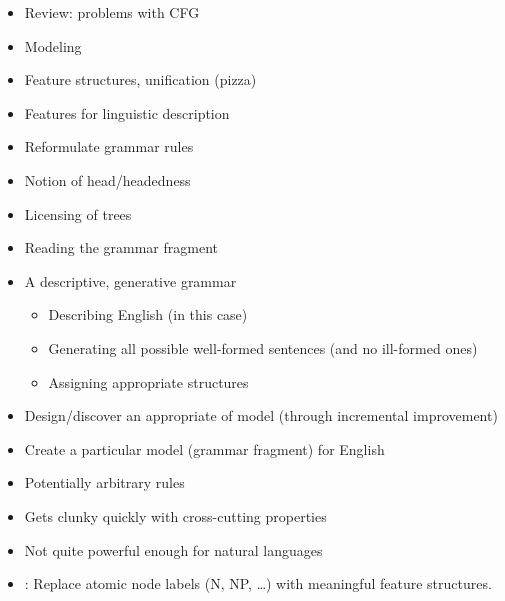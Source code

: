\documentclass[a4paper,landscape,headrule,footrule]{foils}
\begin{document}

\maketitle



\begin{itemize}
\item Review: problems with CFG
\item Modeling
\item Feature structures, unification (pizza)
\item Features for linguistic description
\item Reformulate grammar rules
\item Notion of head/headedness
\item Licensing of trees
\item Reading the grammar fragment
\end{itemize}


\begin{itemize}
\item A descriptive, generative grammar
  \begin{itemize}
  \item Describing English (in this case)
  \item Generating all possible well-formed
    sentences (and no ill-formed ones)
  \item Assigning appropriate structures
  \end{itemize}
\item Design/discover an appropriate  of
model (through incremental improvement)

\item Create a particular model (grammar
fragment) for English
\end{itemize}


\begin{itemize}
\item Potentially arbitrary rules
\item Gets clunky quickly with cross-cutting properties
\item Not quite powerful enough for natural languages
\item {}: Replace atomic node labels (N, NP, \ldots{})  with meaningful feature structures.
\end{itemize}
\end{document}
